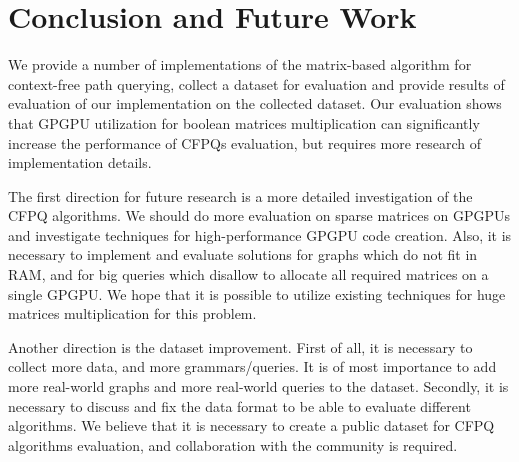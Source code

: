 \section{Conclusion and Future Work}

We provide a number of implementations of the matrix-based algorithm for context-free path querying, collect a dataset for evaluation and provide results of evaluation of our implementation on the collected dataset.
Our evaluation shows that GPGPU utilization for boolean matrices multiplication can significantly increase the performance of CFPQs evaluation, but requires more research of implementation details.

The first direction for future research is a more detailed investigation of the CFPQ algorithms.
We should do more evaluation on sparse matrices on GPGPUs and investigate techniques for high-performance GPGPU code creation.
Also, it is necessary to implement and evaluate solutions for graphs which do not fit in RAM, and for big queries which disallow to allocate all required matrices on a single GPGPU.
We hope that it is possible to utilize existing techniques for huge matrices multiplication for this problem.

Another direction is the dataset improvement.
First of all, it is necessary to collect more data, and more grammars/queries.
It is of most importance to add more real-world graphs and more real-world queries to the dataset.
Secondly, it is necessary to discuss and fix the data format to be able to evaluate different algorithms.
We believe that it is necessary to create a public dataset for CFPQ algorithms evaluation, and collaboration with the community is required.

